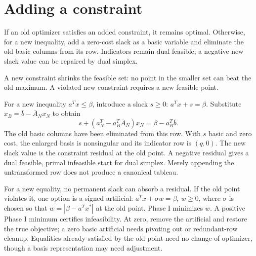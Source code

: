 \documentclass[11pt,a4paper]{article}
\begin{document}
\section{Adding a constraint}\label{sec:new-constraint}
\begin{lecturecore}
  If an old optimizer satisfies an added constraint, it remains optimal.
  Otherwise, for a new inequality, add a zero-cost slack as a basic variable
  and eliminate the old basic columns from its row. Indicators remain dual
  feasible; a negative new slack value can be repaired by dual simplex.
\end{lecturecore}
A new constraint shrinks the feasible set: no point in the smaller set can
beat the old maximum. A violated new constraint requires a new feasible point.

For a new inequality $a^Tx\leq\beta$, introduce a slack $s\geq0$:
$a^Tx+s=\beta$. Substitute $x_B=\bar b-\bar A_Nx_N$ to obtain
\begin{equation}\label{eq:new-row}
  s+(a_N^T-a_B^T\bar A_N)x_N=\beta-a_B^T\bar b.
\end{equation}
The old basic columns have been eliminated from this row. With $s$ basic and
zero cost, the enlarged basis is nonsingular and its indicator row is
$(q,0)$. The new slack value is the constraint residual at the old point.
A negative residual gives a dual feasible, primal infeasible start for
dual simplex. Merely appending the untransformed row does not produce a
canonical tableau.

For a new equality, no permanent slack can absorb a residual. If the old point
violates it, one option is a signed artificial:
$a^Tx+\sigma w=\beta$, $w\geq0$, where $\sigma$ is chosen so that
$w=|\beta-a^Tx^*|$ at the old point. Phase I minimizes $w$.
A positive Phase I minimum certifies infeasibility. At zero, remove the
artificial and restore the true objective; a zero basic artificial needs
pivoting out or redundant-row cleanup. Equalities already satisfied by the
old point need no change of optimizer, though a basis representation may
need adjustment.
\end{document}
